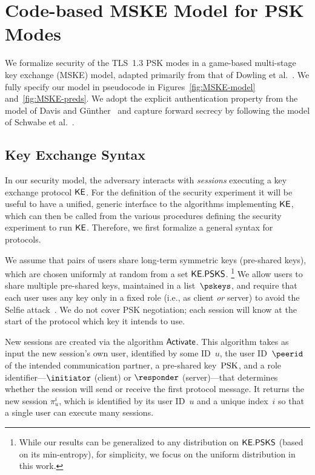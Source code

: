 \section{Code-based MSKE Model for PSK Modes}
\label{sec:ake-model}
We formalize security of the TLS~1.3 PSK modes in a game-based multi-stage key exchange (MSKE) model, adapted primarily from that of Dowling et al.~\cite{JC:DFGS21}. 
We fully specify our model in pseudocode in 
	Figures~\ref{fig:MSKE-model} and~\ref{fig:MSKE-preds}.
We adopt the explicit authentication property from the model of Davis and G{\"u}nther~\cite{ACNS:DavGun21} and capture forward secrecy by following the model of Schwabe et al.~\cite{CCS:SchSteWig20}.


\subsection{Key Exchange Syntax}

In our security model, the adversary interacts with \emph{sessions} executing a key exchange protocol $\mathsf{KE}$.
For the definition of the security experiment it will be useful to have a unified, generic interface to the algorithms implementing $\mathsf{KE}$, which can then be called from the various procedures defining the security experiment to run $\mathsf{KE}$. Therefore, we first formalize a general syntax for protocols.

We assume that pairs of users share long-term symmetric keys (pre-shared keys), which are chosen uniformly at random from a set $\mathsf{KE}.\mathsf{PSKS}$.%
\footnote{%
While our results can be generalized to any distribution on $\mathsf{KE}.\mathsf{PSKS}$ (based on its min-entropy),
for simplicity, we focus on the uniform distribution in this work.
}
We allow users to share multiple pre-shared keys, maintained in a list~$\pskeys$, and require that each user uses any key only in a fixed role (i.e., as client \emph{or} server) to avoid the Selfie attack~\cite{JC:DruGue21}.
We do not cover PSK negotiation;
each session will know at the start of the protocol which key it intends to use. 

New sessions are created via the algorithm $\mathsf{Activate}$.
This algorithm takes as input the new session's own user, identified by some ID~$u$, the user ID~$\peerid$ of the intended communication partner, a pre-shared key~$\mathrm{PSK}$, and a role identifier---$\initiator$ (client) or $\responder$ (server)---that determines whether the session will send or receive the first protocol message.
It returns the new session $\pi_u^i$, which is identified by its user ID~$u$ and a unique index~$i$ so that a single user can execute many sessions.

